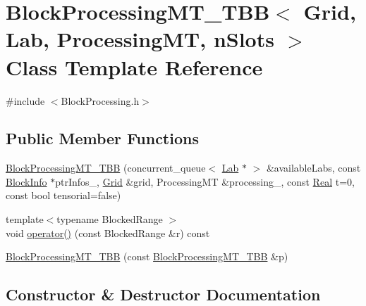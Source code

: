 \hypertarget{class_block_processing_m_t___t_b_b}{}\section{Block\+Processing\+M\+T\+\_\+\+T\+B\+B$<$ Grid, Lab, Processing\+M\+T, n\+Slots $>$ Class Template Reference}
\label{class_block_processing_m_t___t_b_b}


{\ttfamily \#include $<$Block\+Processing.\+h$>$}

\subsection*{Public Member Functions}
\begin{DoxyCompactItemize}
\item 
\hyperlink{class_block_processing_m_t___t_b_b_ab593a07d303a80c94ad90df501d82dad}{Block\+Processing\+M\+T\+\_\+\+T\+B\+B} (concurrent\+\_\+queue$<$ \hyperlink{_definitions_8h_ad6f951af9a2a6ebc1975404882b34314}{Lab} $\ast$ $>$ \&available\+Labs, const \hyperlink{struct_block_info}{Block\+Info} $\ast$ptr\+Infos\+\_\+, \hyperlink{class_grid}{Grid} \&grid, Processing\+M\+T \&processing\+\_\+, const \hyperlink{_h_d_f5_dumper_8h_a445a5f0e2a34c9d97d69a3c2d1957907}{Real} t=0, const bool tensorial=false)
\item 
{\footnotesize template$<$typename Blocked\+Range $>$ }\\void \hyperlink{class_block_processing_m_t___t_b_b_aaef2110d9801cdcb5aec76b1d0c1e343}{operator()} (const Blocked\+Range \&r) const 
\item 
\hyperlink{class_block_processing_m_t___t_b_b_acf41642fa9233a7557a098285e5dd60c}{Block\+Processing\+M\+T\+\_\+\+T\+B\+B} (const \hyperlink{class_block_processing_m_t___t_b_b}{Block\+Processing\+M\+T\+\_\+\+T\+B\+B} \&p)
\end{DoxyCompactItemize}


\subsection{Constructor \& Destructor Documentation}
\hypertarget{class_block_processing_m_t___t_b_b_ab593a07d303a80c94ad90df501d82dad}{}
